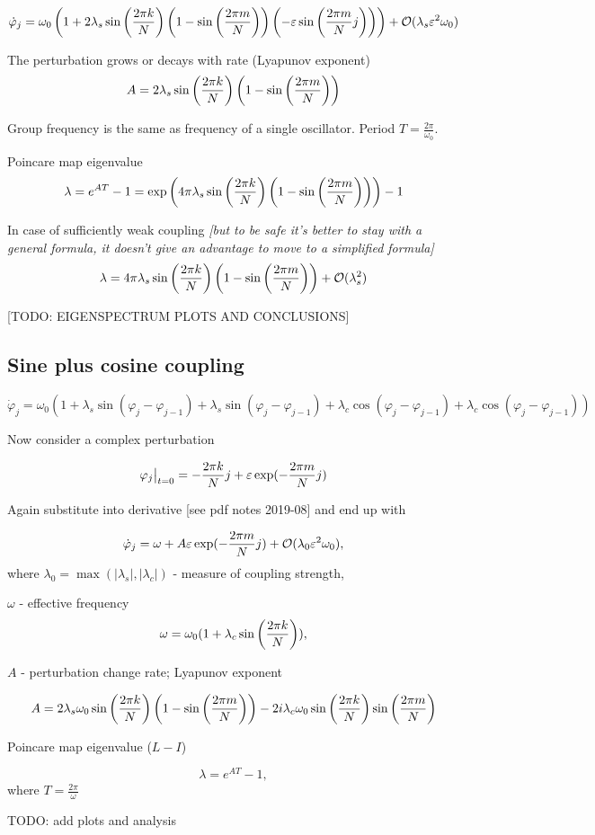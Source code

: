 \documentclass[a4paper,12pt]{article}
\newcommand{\eps}{\varepsilon}
\newcommand{\bigO}{\mathcal{O}}
\begin{document}
\begin{equation}
\dot \varphi_j = 
\omega_0 \left( 1 +  2 \lambda_s  \co{k}{} \left(1 - \co{m}{} \right) \left( - \eps \si{m}{j} \right) \right)  
+ \bigO(\lambda_s \eps ^2 \omega_0)
\end{equation}

The perturbation grows or decays with rate (Lyapunov exponent)
$$
A = 2 \lambda_s  \sin \left( \frac{2 \pi k} {N}  \right) \left(1 - \sin \left( \frac{2 \pi m} {N}  \right) \right)
$$

Group frequency is the same as frequency of a single oscillator. Period $T = \frac{2 \pi}{\omega_0}$.

Poincare map eigenvalue
$$
\lambda = e^{A T} - 1 
= \exp \left( 4 \pi \lambda_s  \sin \left( \frac{2 \pi k} {N}  \right) \left(1 - \sin \left( \frac{2 \pi m} {N}  \right) \right) \right) - 1 
$$

In case of sufficiently weak coupling \textit{[but to be safe it's better to stay with a general formula, it doesn't give an advantage to move to a simplified formula]}
$$
\lambda 
= 4 \pi \lambda_s  \co{k}{} \left(1 - \co{m}{} \right)  + \bigO(\lambda_s^2)
$$

[TODO: EIGENSPECTRUM PLOTS AND CONCLUSIONS]

\subsection*{Sine plus cosine coupling}
\begin{equation}
\dot \varphi_j = \omega_0 \left( 1 + \lambda_s \sin(\varphi_j - \varphi_{j-1})
+ \lambda_s \sin(\varphi_j - \varphi_{j-1})
+ \lambda_c \cos(\varphi_j - \varphi_{j-1})
+ \lambda_c \cos(\varphi_j - \varphi_{j-1}) \right)
\label{eqn:dphidt-sin-cos}
\end{equation}

Now consider a complex perturbation

$$
\varphi_j \big\rvert_{t=0} = - \fr{k}{j} + \eps \exp( - \fr{m}{j})
$$

Again substitute into derivative [see pdf notes 2019-08] and end up with

$$
\dot \varphi_j = \omega + A \eps \exp( - \fr{m}{j}) + \bigO(\lambda_0 \eps ^ 2 \omega_0),
$$
where $\lambda_0 = \max(|\lambda_s|, |\lambda_c|)$ - measure of coupling strength,

$\omega$ - effective frequency
$$
 \omega = \omega_0 (1 + \lambda_c \sin \left( \frac{2 \pi k} {N}  \right)),
$$

$A$ - perturbation change rate; Lyapunov exponent

$$ 
A = 
 2 \lambda_s \omega_0 \sin \left( \frac{2 \pi k} {N}  \right) \left(1 - \sin \left( \frac{2 \pi m} {N}  \right) \right)
- 2 i \lambda_c \omega_0 \sin \left( \frac{2 \pi k} {N}  \right) \sin \left( \frac{2 \pi m} {N}  \right)
$$

Poincare map eigenvalue ($L - I$)

$$ 
\lambda = e^{A T} - 1,
$$
where $T = \frac{2 \pi}{\omega}$

TODO: add plots and analysis
\end{document}

